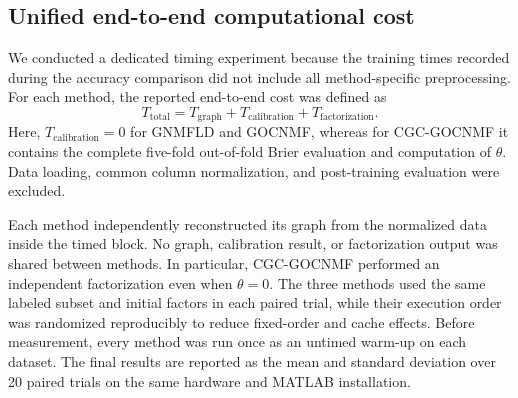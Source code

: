 \subsection{Unified end-to-end computational cost}
\label{subsec:end_to_end_time}

We conducted a dedicated timing experiment because the training times recorded
during the accuracy comparison did not include all method-specific
preprocessing. For each method, the reported end-to-end cost was defined as
\[
T_{\mathrm{total}}
=
T_{\mathrm{graph}}
+
T_{\mathrm{calibration}}
+
T_{\mathrm{factorization}}.
\]
Here, \(T_{\mathrm{calibration}}=0\) for GNMFLD and GOCNMF, whereas for
CGC-GOCNMF it contains the complete five-fold out-of-fold Brier evaluation
and computation of \(\theta\). Data loading, common column normalization, and
post-training evaluation were excluded.

Each method independently reconstructed its graph from the normalized data
inside the timed block. No graph, calibration result, or factorization output
was shared between methods. In particular, CGC-GOCNMF performed an independent
factorization even when \(\theta=0\). The three methods used the same labeled
subset and initial factors in each paired trial, while their execution order
was randomized reproducibly to reduce fixed-order and cache effects. Before
measurement, every method was run once as an untimed warm-up on each dataset.
The final results are reported as the mean and standard deviation over 20
paired trials on the same hardware and MATLAB installation.
